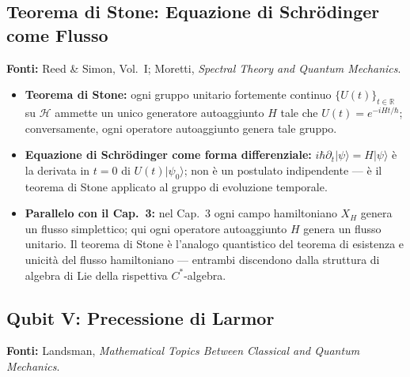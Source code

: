 \documentclass[12pt, a4paper]{article}
\newcommand{\fonti}[1]{%
	\begin{fontebox}
		\textcolor{fontecolor}{\footnotesize\textbf{Fonti:} #1}
	\end{fontebox}%
}
\begin{document}
	\subsection{Teorema di Stone: Equazione di Schrödinger come Flusso}
	
	\fonti{Reed \& Simon, Vol.~I; Moretti, \textit{Spectral Theory and Quantum Mechanics}.}
	
	\begin{itemize}
		\item \textbf{Teorema di Stone:} ogni gruppo unitario fortemente continuo
		$\{U(t)\}_{t \in \mathbb{R}}$ su $\mathcal{H}$ ammette un unico generatore
		autoaggiunto $H$ tale che $U(t) = e^{-iHt/\hbar}$; conversamente, ogni operatore
		autoaggiunto genera tale gruppo.
		\item \textbf{Equazione di Schrödinger come forma differenziale:}
		$i\hbar\partial_t|\psi\rangle = H|\psi\rangle$ è la derivata in $t=0$ di
		$U(t)|\psi_0\rangle$; non è un postulato indipendente --- è il teorema di Stone
		applicato al gruppo di evoluzione temporale.
		\item \textbf{Parallelo con il Cap.\ 3:} nel Cap.\ 3 ogni campo hamiltoniano
		$X_H$ genera un flusso simplettico; qui ogni operatore autoaggiunto $H$ genera
		un flusso unitario. Il teorema di Stone è l'analogo quantistico del teorema
		di esistenza e unicità del flusso hamiltoniano --- entrambi discendono dalla
		struttura di algebra di Lie della rispettiva $C^*$-algebra.
	\end{itemize}
	
	\subsection{Qubit V: Precessione di Larmor}
	
	\fonti{Landsman, \textit{Mathematical Topics Between Classical and Quantum Mechanics}.}
	
\end{document}

